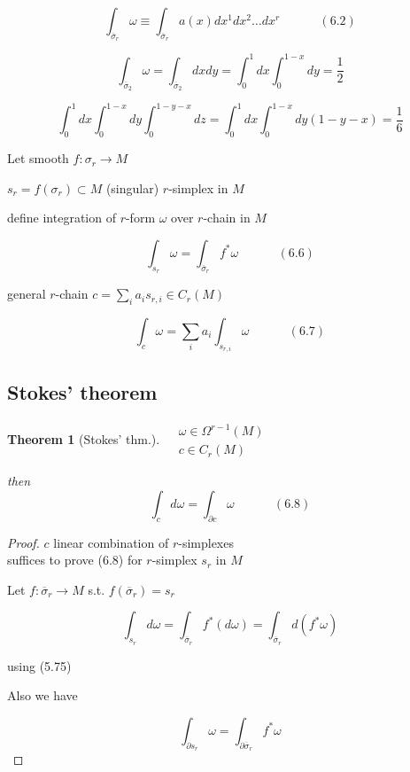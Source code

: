 \documentclass[twoside]{amsart}
\newtheorem{theorem}{Theorem}
\begin{document}
\begin{equation}
\int_{ \overline{\sigma}_r } \omega \equiv \int_{ \overline{\sigma}_r } a(x) dx^1 dx^2 \dots dx^r \quad \quad \quad \, (6.2)
\end{equation}

\[
\int_{ \overline{\sigma}_2} \omega = \int_{ \overline{\sigma}_2 } dx dy = \int_0^1 dx \int_0^{1-x} dy = \frac{1}{2}
\]

\[
\int_0^1 dx \int_0^{1-x}dy \int_0^{1-y-x} dz = \int_0^1 dx \int_0^{1-x} dy (1-y-x) = \frac{1}{6}
\]

Let smooth $f:\sigma_r \to M$

$s_r = f(\sigma_r) \subset M$ (singular) $r$-simplex in $M$

define integration of $r$-form $\omega$ over $r$-chain in $M$

\begin{equation}
\int_{s_r} \omega = \int_{ \overline{\sigma}_r } f^* \omega \quad \quad \quad \, (6.6)
\end{equation}


general $r$-chain $c = \sum_i a_i s_{r,i}  \in C_r(M)$

\begin{equation}
  \int_c \omega = \sum_i a_i \int_{s_{r,i} } \omega \quad \quad \quad \, (6.7)
\end{equation}

\subsection{ Stokes' theorem }

\begin{theorem}[Stokes' thm.]
$\begin{aligned}
& \omega \in \Omega^{r-1}(M) \\ 
& c\in C_r(M)
\end{aligned}$

then
\begin{equation}
\int_c d\omega = \int_{\partial c} \omega \quad \quad \quad \, (6.8)
\end{equation}
\end{theorem}

\begin{proof}
$c$ linear combination of $r$-simplexes \\
suffices to prove (6.8) for $r$-simplex $s_r$ in $M$ 

Let $f:\overline{\sigma}_r \to M$ s.t. $f(\overline{\sigma}_r) = s_r$

\[
\int_{s_r} d\omega = \int_{ \overline{\sigma}_r} f^*(d\omega) = \int_{\overline{\sigma}_r} d(f^* \omega)
\]

using (5.75)

Also we have 

\[
\int_{\partial s_r} \omega = \int_{ \partial \overline{\sigma}_r } f^* \omega
\]
\end{proof}
\end{document}
